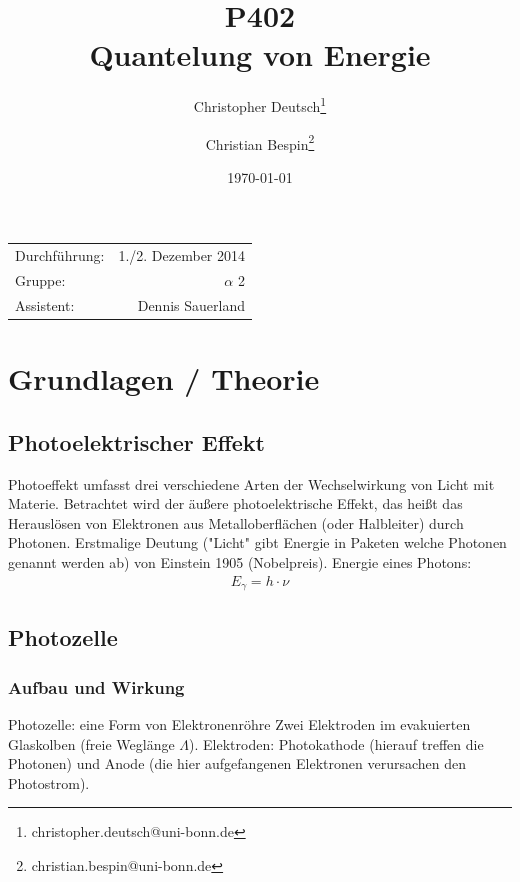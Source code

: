 \documentclass[11pt, a4paper]{article}
\title{P402 \\ Quantelung von Energie}
\author{Christopher Deutsch\footnote{christopher.deutsch@uni-bonn.de} \and Christian Bespin\footnote{christian.bespin@uni-bonn.de}}
\date{\today}
\numberwithin{equation}{section}
\begin{document}
\begin{titlepage}

\maketitle

\begin{center}
\begin{tabular}{l r}
Durchführung: & 1./2. Dezember 2014 \\
Gruppe: & $\alpha$ 2 \\
Assistent: & Dennis Sauerland
\end{tabular}
\end{center}

\begin{abstract}
\noindent

\end{abstract}

\end{titlepage}

\tableofcontents
\newpage


\section{Grundlagen / Theorie}

\subsection{Photoelektrischer Effekt}
Photoeffekt umfasst drei verschiedene Arten der Wechselwirkung von Licht mit Materie.
Betrachtet wird der äußere photoelektrische Effekt, das heißt das Herauslösen von Elektronen aus Metalloberflächen (oder Halbleiter) durch Photonen.
Erstmalige Deutung ("Licht" gibt Energie in Paketen welche Photonen genannt werden ab) von Einstein 1905 (Nobelpreis).
Energie eines Photons:
\begin{align}
	E_\gamma = h \cdot \nu
\end{align}




\subsection{Photozelle}

\subsubsection{Aufbau und Wirkung}
Photozelle: eine Form von Elektronenröhre
Zwei Elektroden im evakuierten Glaskolben (freie Weglänge $\Lambda$).
Elektroden: Photokathode (hierauf treffen die Photonen) und Anode (die hier aufgefangenen Elektronen verursachen den Photostrom).
\end{document}
